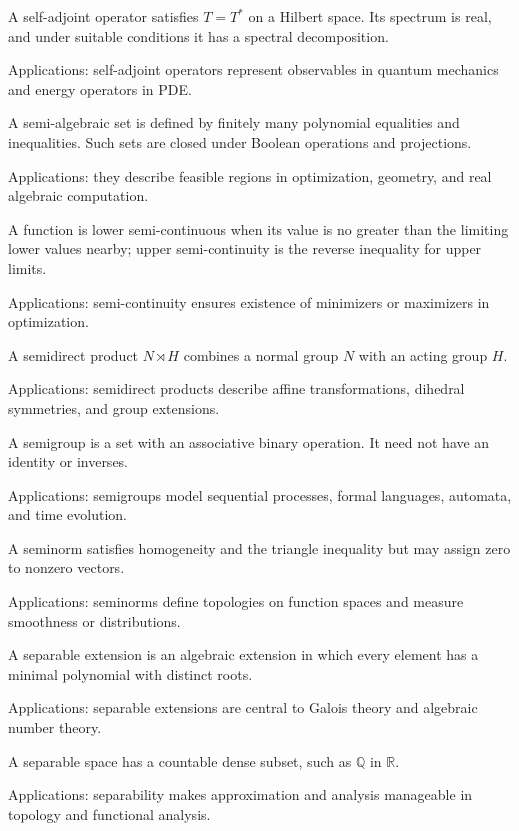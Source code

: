 A self-adjoint operator satisfies $T=T^*$ on a Hilbert space. Its spectrum is real, and under suitable conditions it has a spectral decomposition. \par\noindent Applications: self-adjoint operators represent observables in quantum mechanics and energy operators in PDE.

A semi-algebraic set is defined by finitely many polynomial equalities and inequalities. Such sets are closed under Boolean operations and projections. \par\noindent Applications: they describe feasible regions in optimization, geometry, and real algebraic computation.

A function is lower semi-continuous when its value is no greater than the limiting lower values nearby; upper semi-continuity is the reverse inequality for upper limits. \par\noindent Applications: semi-continuity ensures existence of minimizers or maximizers in optimization.

A semidirect product $N\rtimes H$ combines a normal group $N$ with an acting group $H$. \par\noindent Applications: semidirect products describe affine transformations, dihedral symmetries, and group extensions.

A semigroup is a set with an associative binary operation. It need not have an identity or inverses. \par\noindent Applications: semigroups model sequential processes, formal languages, automata, and time evolution.

A seminorm satisfies homogeneity and the triangle inequality but may assign zero to nonzero vectors. \par\noindent Applications: seminorms define topologies on function spaces and measure smoothness or distributions.

A separable extension is an algebraic extension in which every element has a minimal polynomial with distinct roots. \par\noindent Applications: separable extensions are central to Galois theory and algebraic number theory.

A separable space has a countable dense subset, such as $\mathbb Q$ in $\mathbb R$. \par\noindent Applications: separability makes approximation and analysis manageable in topology and functional analysis.

